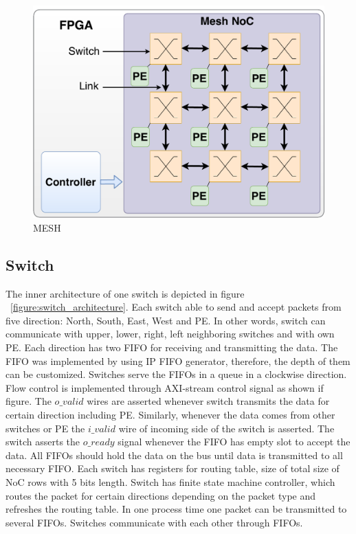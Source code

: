 \begin{figure}
    \includegraphics[width=\columnwidth]{Figures/overall3.pdf}
    \caption{MESH} 
    \label{figure:mesh}
\end{figure}

\subsection{Switch}
The inner architecture of one switch is depicted in figure ~\ref{figure:switch_architecture}. Each switch able to send and accept packets from five direction: North, South, East, West and PE. In other words, switch can communicate with upper, lower, right, left neighboring switches and with own PE. Each direction has two FIFO for receiving and transmitting the data. The FIFO was implemented by using IP FIFO generator, therefore, the depth of them can be customized. Switches serve the FIFOs in a queue in a clockwise direction.  Flow control is implemented through AXI-stream control signal as shown if figure.  The $o\_valid$ wires are asserted whenever switch transmits the data for certain direction including PE. Similarly, whenever the data comes from other switches or PE the $i\_valid$ wire of incoming side of the switch is asserted. The switch asserts the $o\_ready$ signal whenever the FIFO has empty slot to accept the data. All FIFOs should hold the data on the bus until data is transmitted to all necessary FIFO. Each switch has registers for routing table, size of total size of NoC rows with 5 bits length. Switch has finite state machine controller, which routes the packet for certain directions depending on the packet type and refreshes the routing table. In one process time one packet can be transmitted to several FIFOs. Switches communicate with each other through FIFOs.  

